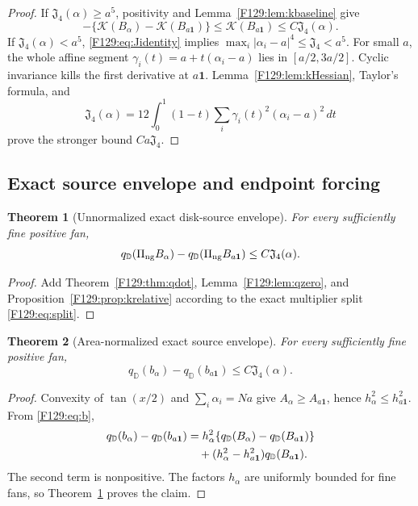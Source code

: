 \documentclass[11pt]{amsart}
\numberwithin{equation}{section}
\newtheorem{theorem}{Theorem}[section]
\theoremstyle{definition}
\theoremstyle{remark}
\newcommand{\PiNG}{\Pi_{\rm ng}}
\newcommand{\Jfour}{\mathfrak J_4}
\newcommand{\qD}{q_{\mathbb D}}
\newcommand{\kform}{\mathcal K}
\begin{document}
\begin{proof}
If \(\Jfour(\alpha)\ge a^5\), positivity and
Lemma~\ref{F129:lem:kbaseline} give
\begin{equation}
 -\{\kform(B_\alpha)-\kform(B_{a\mathbf1})\}
 \le\kform(B_{a\mathbf1})\le C\Jfour(\alpha).
\end{equation}
If \(\Jfour(\alpha)<a^5\), \eqref{F129:eq:Jidentity} implies
\(\max_i|\alpha_i-a|^4\le\Jfour<a^5\).  For small \(a\), the whole affine
segment \(\gamma_i(t)=a+t(\alpha_i-a)\) lies in
\([a/2,3a/2]\).  Cyclic invariance kills the first derivative at
\(a\mathbf1\).  Lemma~\ref{F129:lem:kHessian}, Taylor's formula, and
\begin{equation}
 \Jfour(\alpha)
 =12\int_0^1(1-t)\sum_i\gamma_i(t)^2(\alpha_i-a)^2\,dt
\end{equation}
prove the stronger bound \(Ca\Jfour\).
\end{proof}

\subsection{Exact source envelope and endpoint forcing}

\begin{theorem}[Unnormalized exact disk-source envelope]\label{F129:thm:B}
For every sufficiently fine positive fan,
\begin{equation}\label{F129:eq:B-envelope}
 \qD(\PiNG B_\alpha)-\qD(\PiNG B_{a\mathbf1})
 \le C\Jfour(\alpha).
\end{equation}
\end{theorem}

\begin{proof}
Add Theorem~\ref{F129:thm:qdot}, Lemma~\ref{F129:lem:qzero}, and
Proposition~\ref{F129:prop:krelative} according to the exact multiplier split
\eqref{F129:eq:split}.
\end{proof}

\begin{theorem}[Area-normalized exact source envelope]\label{F129:thm:b}
For every sufficiently fine positive fan,
\begin{equation}\label{F129:eq:b-envelope}
 \boxed{\qD(b_\alpha)-\qD(b_{a\mathbf1})
 \le C\Jfour(\alpha).}
\end{equation}
\end{theorem}

\begin{proof}
Convexity of \(\tan(x/2)\) and \(\sum_i\alpha_i=Na\) give
\(A_\alpha\ge A_{a\mathbf1}\), hence
\(h_\alpha^2\le h_{a\mathbf1}^2\).  From \eqref{F129:eq:b},
\begin{align}
 \qD(b_\alpha)-\qD(b_{a\mathbf1})
 &=h_\alpha^2\{\qD(B_\alpha)-\qD(B_{a\mathbf1})\}\notag\\
 &\quad +(h_\alpha^2-h_{a\mathbf1}^2)\qD(B_{a\mathbf1}).\label{F129:eq:area-sign}
\end{align}
The second term is nonpositive.  The factors \(h_\alpha\) are uniformly
bounded for fine fans, so Theorem~\ref{F129:thm:B} proves the claim.
\end{proof}
\endgroup
\end{document}
